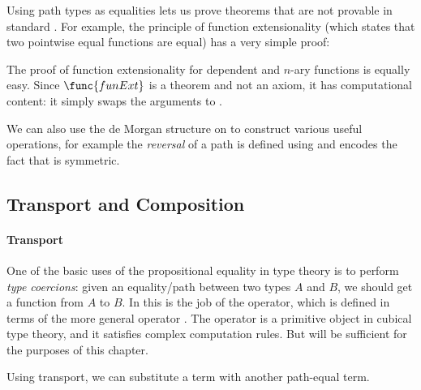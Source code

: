 Using path types as equalities lets us prove theorems that are not provable in
standard \Agda. For example, the principle of function extensionality (which states
that two pointwise equal functions are equal) has a very simple proof:
% 
% 

The proof of function extensionality for dependent and $n$-ary
functions is equally easy. Since $\func{funExt}$ is a
theorem and not an axiom, it has computational
content: it simply swaps the arguments to .

We can also use the de Morgan structure on  to construct various
useful operations, for example the \emph{reversal} of a path is defined
using  and encodes the fact that  is symmetric.
%
% 

\subsection{Transport and Composition}

\paragraph*{Transport}
% 
One of the basic uses of the propositional equality in type theory is 
to perform \emph{type coercions}: 
% 
given an equality/path between two types \( A \) and \( B \), we should get
a function from \( A \) to \( B \).
% 
In \CubicalAgda this is the job of the  operator,
which is defined in terms of the more general operator .
%
% 
The  operator is a primitive object in cubical type theory,
and it satisfies complex computation rules.
% 
But  will be sufficient for the purposes of this chapter.

Using transport, we can substitute a term with another path-equal term.
%
% 

